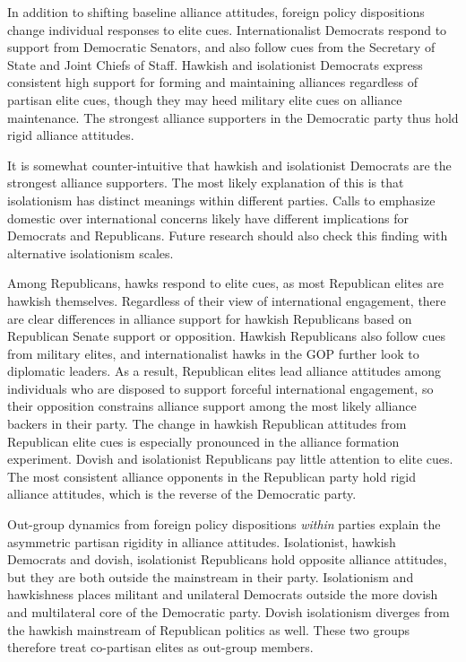 \documentclass[12pt]{article}
\begin{document}
In addition to shifting baseline alliance attitudes, foreign policy dispositions change individual responses to elite cues. 
Internationalist Democrats respond to support from Democratic Senators, and also follow cues from the Secretary of State and Joint Chiefs of Staff. 
Hawkish and isolationist Democrats express consistent high support for forming and maintaining alliances regardless of partisan elite cues, though they may heed military elite cues on alliance maintenance. 
The strongest alliance supporters in the Democratic party thus hold rigid alliance attitudes.


It is somewhat counter-intuitive that hawkish and isolationist Democrats are the strongest alliance supporters. 
The most likely explanation of this is that isolationism has distinct meanings within different parties.
Calls to emphasize domestic over international concerns likely have different implications for Democrats and Republicans.
Future research should also check this finding with alternative isolationism scales. 


Among Republicans, hawks respond to elite cues, as most Republican elites are hawkish themselves. 
Regardless of their view of international engagement, there are clear differences in alliance support for hawkish Republicans based on Republican Senate support or opposition.
Hawkish Republicans also follow cues from military elites, and internationalist hawks in the GOP further look to diplomatic leaders. 
As a result, Republican elites lead alliance attitudes among individuals who are disposed to support forceful international engagement, so their opposition constrains alliance support among the most likely alliance backers in their party. 
The change in hawkish Republican attitudes from Republican elite cues is especially pronounced in the alliance formation experiment. 
Dovish and isolationist Republicans pay little attention to elite cues. 
The most consistent alliance opponents in the Republican party hold rigid alliance attitudes, which is the reverse of the Democratic party. 


Out-group dynamics from foreign policy dispositions \textit{within} parties explain the asymmetric partisan rigidity in alliance attitudes. 
Isolationist, hawkish Democrats and dovish, isolationist Republicans hold opposite alliance attitudes, but they are both outside the mainstream in their party.
Isolationism and hawkishness places militant and unilateral Democrats outside the more dovish and multilateral core of the Democratic party. 
Dovish isolationism diverges from the hawkish mainstream of Republican politics as well. 
These two groups therefore treat co-partisan elites as out-group members.  
\end{document}

